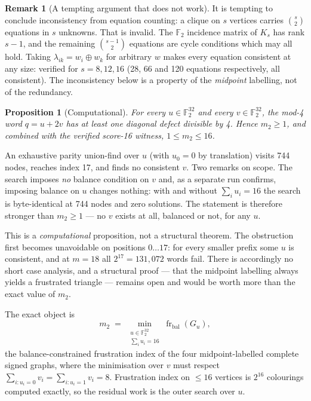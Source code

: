 \documentclass[11pt,a4paper]{article}
\newtheorem{proposition}[theorem]{Proposition}
\theoremstyle{definition}
\newtheorem{remark}[theorem]{Remark}
\newcommand{\F}{\mathbb{F}}
\begin{document}
\begin{remark}[A tempting argument that does not work]
It is tempting to conclude inconsistency from equation counting: a clique on $s$
vertices carries $\binom{s}{2}$ equations in $s$ unknowns. That is invalid. The
$\F_2$ incidence matrix of $K_s$ has rank $s-1$, and the remaining
$\binom{s-1}{2}$ equations are cycle conditions which may all hold. Taking
$\lambda_{ik}=w_i\oplus w_k$ for arbitrary $w$ makes every equation consistent at
any size: verified for $s=8,12,16$ (28, 66 and 120 equations respectively, all
consistent). The inconsistency below is a property of the \emph{midpoint}
labelling, not of the redundancy.
\end{remark}

\begin{proposition}[Computational]
\label{prop:m2}
For every $u\in\F_2^{32}$ and every $v\in\F_2^{32}$, the mod-4 word $q=u+2v$ has
at least one diagonal defect divisible by 4. Hence $m_2\ge1$, and combined with
the verified score-16 witness, $1\le m_2\le16$.
\end{proposition}

An exhaustive parity union-find over $u$ (with $u_0=0$ by translation) visits 744
nodes, reaches index 17, and finds no consistent $v$. Two remarks on scope. The
search imposes \emph{no} balance condition on $v$ and, as a separate run
confirms, imposing balance on $u$ changes nothing: with and without
$\sum_i u_i=16$ the search is byte-identical at 744 nodes and zero solutions. The
statement is therefore stronger than $m_2\ge1$ --- no $v$ exists at all, balanced
or not, for any $u$.

This is a \emph{computational} proposition, not a structural theorem. The
obstruction first becomes unavoidable on positions $0\ldots17$: for every
smaller prefix some $u$ is consistent, and at $m=18$ all $2^{17}=131{,}072$ words
fail. There is accordingly no short case analysis, and a structural proof --- that
the midpoint labelling always yields a frustrated triangle --- remains open and
would be worth more than the exact value of $m_2$.

The exact object is
\[
m_2 \;=\; \min_{\substack{u\in\F_2^{32}\\ \sum_i u_i=16}}
\operatorname{fr}_{\mathrm{bal}}(G_u),
\]
the balance-constrained frustration index of the four midpoint-labelled complete
signed graphs, where the minimisation over $v$ must respect
$\sum_{i:u_i=0}v_i=\sum_{i:u_i=1}v_i=8$. Frustration index on $\le16$ vertices is
$2^{16}$ colourings computed exactly, so the residual work is the outer search
over $u$.
\end{document}
